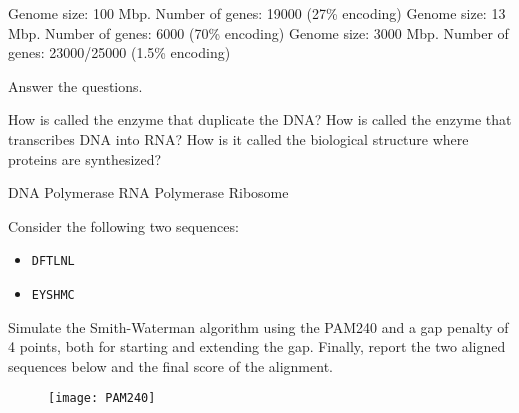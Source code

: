 \begin{Answer} [
  ref={ex2},
  number={2}
 ]

  \Question Genome size: 100 Mbp. Number of genes: 19000 (27\% encoding)
  \Question Genome size: 13 Mbp. Number of genes: 6000 (70\% encoding)
  \Question Genome size: 3000 Mbp. Number of genes: 23000/25000 (1.5\% encoding)

\end{Answer}

\begin{Exercise} [
  title={Enzyme},
  difficulty={1},
  label={ex3},
  origin={G. Valle}
 ]

  Answer the questions.

  \Question How is called the enzyme that duplicate the DNA?
  \Question How is called the enzyme that transcribes DNA into RNA?
  \Question How is it called the biological structure where proteins are
synthesized?
\end{Exercise}

\begin{Answer} [
  ref={ex3},
  number={3}
 ]

  \Question DNA Polymerase
  \Question RNA Polymerase
  \Question Ribosome
\end{Answer}

\begin{Exercise} [
  title={Smith and Waterman algorithm},
  difficulty={1},
  label={exSW},
  origin={G. Valle}
 ]

 Consider the following two sequences:

 \begin{itemize}
  \item \texttt{DFTLNL}
  \item \texttt{EYSHMC}
 \end{itemize}

 Simulate the Smith-Waterman algorithm using the PAM240 and a gap penalty of
 4 points, both for starting and extending the gap.
 Finally, report the two aligned sequences below and the final score of the
 alignment.

 \begin{figure}[H]
  \centering
  \texttt{[image: PAM240]}
 \end{figure}

\end{Exercise}

